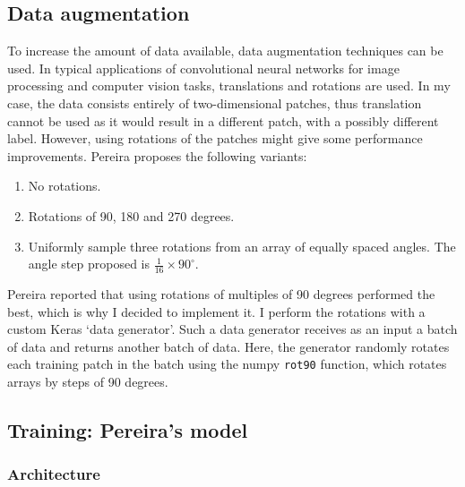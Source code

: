 \documentclass[12pt,a4paper,twoside,openright]{report}
\begin{document}
\subsection{Data augmentation}
To increase the amount of data available, data augmentation techniques can be used. In typical applications of convolutional neural networks for image processing and computer vision tasks, translations and rotations are used. In my case, the data consists entirely of two-dimensional patches, thus translation cannot be used as it would result in a different patch, with a possibly different label. However, using rotations of the patches might give some performance improvements. Pereira proposes the following variants:
\begin{enumerate}
	\item No rotations.
	\item Rotations of 90, 180 and 270 degrees.
	\item Uniformly sample three rotations from an array of equally spaced angles. The angle step proposed is $\frac{1}{16} \times 90^{\circ}$.
\end{enumerate}
Pereira reported that using rotations of multiples of 90 degrees performed the best, which is why I decided to implement it. I perform the rotations with a custom Keras `data generator'. Such a data generator receives as an input a batch of data and returns another batch of data. Here, the generator randomly rotates each training patch in the batch using the numpy \texttt{rot90} function, which rotates arrays by steps of 90 degrees.

\subsection{Training: Pereira's model}

\subsubsection{Architecture}
\end{document}
